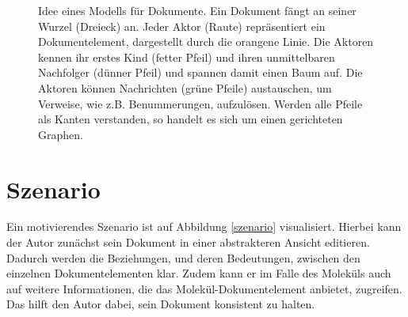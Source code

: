 \begin{figure}[h!]
\centering
{}
\caption[Idee eines Modells für Dokumente]{ Idee eines Modells für Dokumente. Ein Dokument fängt an seiner Wurzel (Dreieck) an. Jeder Aktor (Raute) repräsentiert ein Dokumentelement, dargestellt durch die orangene Linie. Die Aktoren kennen ihr erstes Kind (fetter Pfeil) und ihren unmittelbaren Nachfolger (dünner Pfeil) und spannen damit einen Baum auf. Die Aktoren können Nachrichten (grüne Pfeile) austauschen, um Verweise, wie z.B. Benummerungen, aufzulösen. Werden alle Pfeile als Kanten verstanden, so handelt es sich um einen gerichteten Graphen. }\label{idee}
\end{figure}
 
\section{Szenario}\label{}
 
Ein motivierendes Szenario ist auf Abbildung \ref{szenario} visualisiert. Hierbei kann der Autor zunächst sein Dokument in einer abstrakteren Ansicht editieren. Dadurch werden die Beziehungen, und deren Bedeutungen, zwischen den einzelnen Dokumentelementen klar. Zudem kann er im Falle des Moleküls auch auf weitere Informationen, die das Molekül-Dokumentelement anbietet, zugreifen. Das hilft den Autor dabei, sein Dokument konsistent zu halten.

